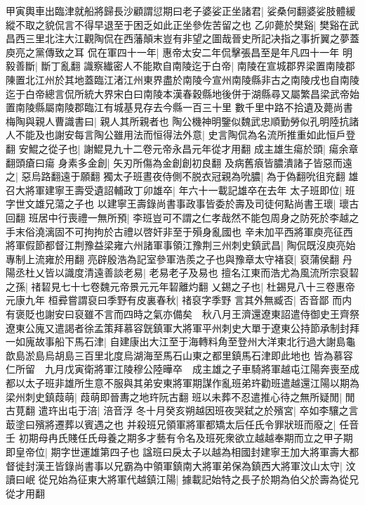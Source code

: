 甲寅輿車出臨津就船將歸長沙顧謂愆期曰老子婆娑正坐諸君|{
	娑桑何翻婆娑肢體緩縱不取之貌侃言不得早退至于困乏如此正坐參佐苦留之也}
乙卯薨於樊谿|{
	樊谿在武昌西三里北注大江觀陶侃在西藩顛末豈有非望之圖哉晉史所記决指之事折翼之夢蓋庾亮之黨傳致之耳}
侃在軍四十一年|{
	惠帝太安二年侃擊張昌至是年凡四十一年}
明毅善斷|{
	斷丁亂翻}
識察纎密人不能欺自南陵迄于白帝|{
	南陵在宣城郡界梁置南陵郡陳置北江州於其地蓋臨江渚江州東界盡於南陵今宣州南陵縣非古之南陵戌也自南陵迄于白帝總言侃所統大界宋白曰南陵本漢春穀縣地後併于湖縣尋又屬繁昌梁武帝始置南陵縣屬南陵郡臨江有城基見存去今縣一百三十里}
數千里中路不拾遺及薨尚書梅陶與親人曹識書曰|{
	親人其所親者也}
陶公機神明鑒似魏武忠順勤勞似孔明陸抗諸人不能及也謝安每言陶公雖用法而恒得法外意|{
	史言陶侃為名流所推重如此恒戶登翻}
安鯤之從子也|{
	謝鯤見九十二卷元帝永昌元年從才用翻}
成主雄生瘍於頭|{
	瘍余章翻頭瘡曰瘍}
身素多金創|{
	矢刃所傷為金創創初良翻}
及病舊㾗皆膿潰諸子皆惡而遠之|{
	惡烏路翻遠于願翻}
獨太子班晝夜侍側不脱衣冠親為吮膿|{
	為于偽翻吮徂兖翻}
雄召大將軍建寧王壽受遺詔輔政丁卯雄卒|{
	年六十一載記雄卒在去年}
太子班即位|{
	班字世文雄兄蕩之子也}
以建寧王壽錄尚書事政事皆委於壽及司徒何點尚書王瓌|{
	瓌古回翻}
班居中行喪禮一無所預|{
	李班豈可不謂之仁孝哉然不能包周身之防死於李越之手末俗澆漓固不可拘拘於古禮以啓奸非至于殞身亂國也}
辛未加平西將軍庾亮征西將軍假節都督江荆豫益梁雍六州諸軍事領江豫荆三州刺史鎮武昌|{
	陶侃既沒庾亮始專制上流雍於用翻}
亮辟殷浩為記室參軍浩羨之子也與豫章太守褚裒|{
	裒蒲侯翻}
丹陽丞杜乂皆以識度清遠善談老易|{
	老易老子及易也}
擅名江東而浩尤為風流所宗裒䂮之孫|{
	禇䂮見七十七卷魏元帝景元元年䂮離灼翻}
乂錫之子也|{
	杜錫見八十三卷惠帝元康九年}
桓彛嘗謂裒曰季野有皮裏春秋|{
	禇裒字季野}
言其外無臧否|{
	否音鄙}
而内有褒貶也謝安曰裒雖不言而四時之氣亦備矣　秋八月王濟還遼東詔遣侍御史王齊祭遼東公廆又遣謁者徐孟策拜慕容皝鎮軍大將軍平州刺史大單于遼東公持節承制封拜一如廆故事船下馬石津|{
	自建康出大江至于海轉料角至登州大洋東北行過大謝島龜歆島淤島烏胡島三百里北度烏湖海至馬石山東之都里鎮馬石津即此地也}
皆為慕容仁所留　九月戊寅衛將軍江陵穆公陸曄卒　成主雄之子車騎將軍越屯江陽奔喪至成都以太子班非雄所生意不服與其弟安東將軍期謀作亂班弟玝勸班遣越還江陽以期為梁州刺史鎮葭萌|{
	葭萌即晉夀之地玝阮古翻}
班以未葬不忍遣推心待之無所疑閒|{
	閒古莧翻}
遣玝出屯于涪|{
	涪音浮}
冬十月癸亥朔越因班夜哭弑之於殯宮|{
	卒如李驤之言菆塗曰殯將遷葬以賓遇之也}
并殺班兄領軍將軍都矯太后任氏令罪狀班而廢之|{
	任音壬}
初期母冉氏賤任氏母養之期多才藝有令名及班死衆欲立越越奉期而立之甲子期即皇帝位|{
	期字世運雄第四子也}
諡班曰戾太子以越為相國封建寧王加大將軍壽大都督徙封漢王皆錄尚書事以兄霸為中領軍鎮南大將軍弟保為鎮西大將軍汶山太守|{
	汶讀曰岷}
從兄始為征東大將軍代越鎮江陽|{
	據載記始特之長子於期為伯父於壽為從兄從才用翻}
